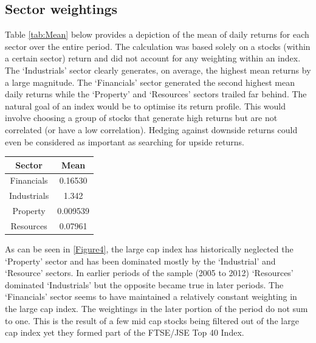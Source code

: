 \documentclass[11pt,preprint, authoryear]{elsarticle}
\let\origtable\table
\let\endorigtable\endtable
\renewenvironment{table}[1][2] {
    \expandafter\origtable\expandafter[H]
} {
    \endorigtable
}
\numberwithin{equation}{section}
\numberwithin{figure}{section}
\numberwithin{table}{section}
\begin{document}
\hypertarget{sector-weightings}{%
\subsection{Sector weightings}\label{sector-weightings}}

Table \ref{tab:Mean} below provides a depiction of the mean of daily
returns for each sector over the entire period. The calculation was
based solely on a stocks (within a certain sector) return and did not
account for any weighting within an index. The `Industrials' sector
clearly generates, on average, the highest mean returns by a large
magnitude. The `Financials' sector generated the second highest mean
daily returns while the `Property' and `Resources' sectors trailed far
behind. The natural goal of an index would be to optimise its return
profile. This would involve choosing a group of stocks that generate
high returns but are not correlated (or have a low correlation). Hedging
against downside returns could even be considered as important as
searching for upside returns.

\begin{table}[h]
\begin{center}
    \begin{tabular}{| c | c |}
    \hline
        Sector & Mean \\
        \hline
        Financials & 0.16530 \\
        Industrials & 1.342 \\
        Property & 0.009539 \\
        Resources & 0.07961 \\
        \hline
    \end{tabular}
    \caption{Mean daily returns}
    \label{tab:Mean}
\end{center}
\end{table}

As can be seen in \ref{Figure4}, the large cap index has historically
neglected the `Property' sector and has been dominated mostly by the
`Industrial' and `Resource' sectors. In earlier periods of the sample
(2005 to 2012) `Resources' dominated `Industrials' but the opposite
became true in later periods. The `Financials' sector seems to have
maintained a relatively constant weighting in the large cap index. The
weightings in the later portion of the period do not sum to one. This is
the result of a few mid cap stocks being filtered out of the large cap
index yet they formed part of the FTSE/JSE Top 40 Index.
\end{document}
